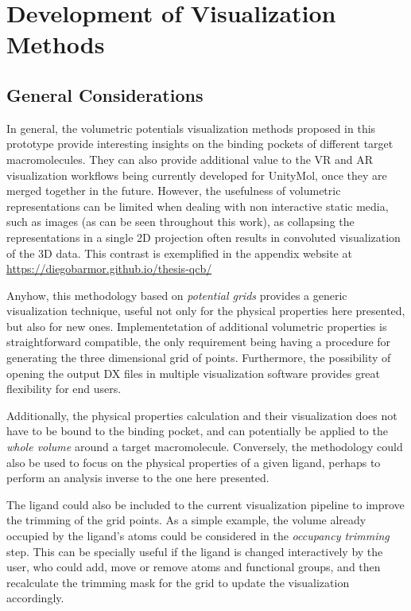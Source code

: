 \section{Development of Visualization Methods}
  \subsection{General Considerations}
    In general, the volumetric potentials visualization methods proposed in this prototype provide interesting insights on the binding pockets of different target macromolecules. They can also provide additional value to the VR and AR visualization workflows being currently developed for UnityMol, once they are merged together in the future. However, the usefulness of volumetric representations can be limited when dealing with non interactive static media, such as images (as can be seen throughout this work), as collapsing the representations in a single 2D projection often results in convoluted visualization of the 3D data. This contrast is exemplified in the appendix website at \url{https://diegobarmor.github.io/thesis-qcb/}

    Anyhow, this methodology based on \textit{potential grids} provides a generic visualization technique, useful not only for the physical properties here presented, but also for new ones. Implementetation of additional volumetric properties is straightforward compatible, the only requirement being having a procedure for generating the three dimensional grid of points. Furthermore, the possibility of opening the output DX files in multiple visualization software provides great flexibility for end users.

    Additionally, the physical properties calculation and their visualization does not have to be bound to the binding pocket, and can potentially be applied to the \textit{whole volume} around a target macromolecule. Conversely, the methodology could also be used to focus on the physical properties of a given ligand, perhaps to perform an analysis inverse to the one here presented.

    The ligand could also be included to the current visualization pipeline to improve the trimming of the grid points. As a simple example, the volume already occupied by the ligand's atoms could be considered in the \textit{occupancy trimming} step. This can be specially useful if the ligand is changed interactively by the user, who could add, move or remove atoms and functional groups, and then recalculate the trimming mask for the grid to update the visualization accordingly.

